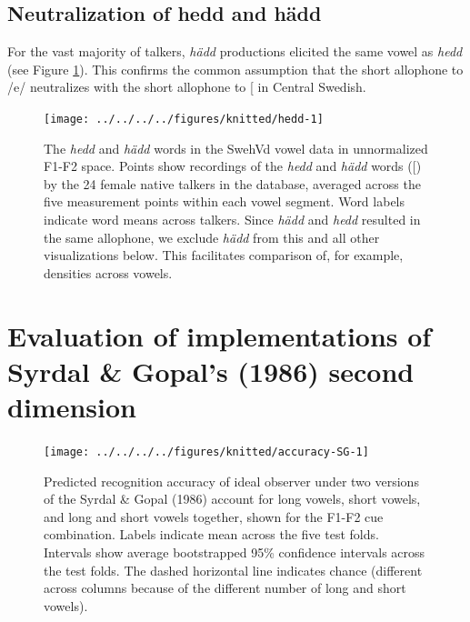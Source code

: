 \documentclass[utf8]{frontiers_suppmat} %
\begin{document}
\hypertarget{sec:neutralize}{%
\subsection{Neutralization of hedd and hädd}\label{sec:neutralize}}

For the vast majority of talkers, \emph{hädd} productions elicited the same vowel as \emph{hedd} (see Figure \ref{fig:hedd}). This confirms the common assumption that the short allophone to /e/ neutralizes with the short allophone to {[}\ipatext{ɛ}{]} in Central Swedish.



\begin{figure}

{\centering \texttt{[image: ../../../../figures/knitted/hedd-1]} 

}

\caption{The \emph{hedd} and \emph{hädd} words in the SwehVd vowel data in unnormalized F1-F2 space. Points show recordings of the \emph{hedd} and \emph{hädd} words ({[}\ipatext{ɛ}{]}) by the 24 female native talkers in the database, averaged across the five measurement points within each vowel segment. Word labels indicate word means across talkers. Since \emph{hädd} and \emph{hedd} resulted in the same allophone, we exclude \emph{hädd} from this and all other visualizations below. This facilitates comparison of, for example, densities across vowels.}\label{fig:hedd}
\end{figure}

\hypertarget{sec:SG-eval}{%
\section{Evaluation of implementations of Syrdal \& Gopal's (1986) second dimension}\label{sec:SG-eval}}

\begin{figure}

{\centering \texttt{[image: ../../../../figures/knitted/accuracy-SG-1]} 

}

\caption{Predicted recognition accuracy of ideal observer under two versions of the Syrdal \& Gopal (1986) account for long vowels, short vowels, and long and short vowels together, shown for the F1-F2 cue combination. Labels indicate mean across the five test folds. Intervals show average bootstrapped 95\% confidence intervals across the test folds. The dashed horizontal line indicates chance (different across columns because of the different number of long and short vowels).}\label{fig:accuracy-SG}
\end{figure}
\end{document}
